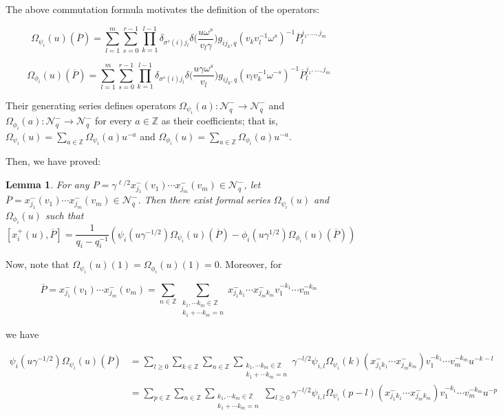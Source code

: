 \documentclass[12pt]{amsart}
\newtheorem{lem}[thm]{Lemma}
\numberwithin{equation}{section}
\newcommand{\Z}{\ensuremath{\mathbb{Z}}}
\newcommand{\mc}[1]{\mathcal{#1}}
\begin{document}
The above commutation formula motivates the definition of the operators: 

$$ \Omega_{\psi_i}(u)(\overline{P}) = \sum_{l=1}^{m}  \sum_{s=0}^{r-1} \prod_{k=1}^{l-1}\delta_{\sigma^s(i)j_l}\delta\Big(\frac{u \omega^s}{v_l\gamma }\Big)   g_{ij_k,q}(v_{k}v_l^{-1}\omega^s)^{-1} \overline{P}_l^{j_1, \ldots, j_m}$$

$$\Omega_{\phi_i}(u)(\overline{P}) = \sum_{l=1}^{m} \sum_{s=0}^{r-1} \prod_{k=1}^{l-1}\delta_{\sigma^s(i)j_l}\delta\Big(\frac{u\gamma \omega^s}{v_l}\Big) g_{ij_k,q}(v_lv_k^{-1}\omega^{-s})^{-1}\overline{P}_l^{j_1, \ldots, j_m} $$

Their generating series defines operators $\Omega_{\psi_i}(a) : \mc{N}_q^- \to \mc{N}_q^-$ and $\Omega_{\phi_i}(a) : \mc{N}_q^- \to \mc{N}_q^- $ for every $a \in \Z$ as their coefficients; that is, $\Omega_{\psi_i}(u) = \sum_{a\in \Z} \Omega_{\psi_i}(a)u^{-a}$ and  $\Omega_{\phi_i}(u) = \sum_{a\in \Z} \Omega_{\phi_i}(a)u^{-a}$. 


Then, we have proved:

\begin{lem}
    For any $P = \gamma^{\ell/2}x_{j_1}^{-}(v_1)\cdots x_{j_m}^{-}(v_m) \in \mc{N}_q^-$, let $\overline{P} = x_{j_1}^{-}(v_1)\cdots x_{j_m}^{-}(v_m) \in \mc{N}_q^-$. Then there exist formal series $\Omega_{\psi_i}(u)$ and $\Omega_{\phi_i}(u)$ such that 
    $$ [x_i^{+}(u), \overline{P}] = \frac{1}{q_i-q_i^{-1}} \left(\psi_i(u\gamma^{-1/2})\Omega_{\psi_i}(u)(\overline{P}) - \phi_i(u\gamma^{1/2})\Omega_{\phi_i}(u)(\overline{P})\right)$$
\end{lem}

Now, note that $\Omega_{\psi_i}(u)(1) = \Omega_{\phi_i}(u)(1) = 0$. Moreover, for 

$$ \overline{P} = x_{j_1}^{-}(v_1)\cdots x_{j_m}^{-}(v_m) = \sum_{n\in\Z}\sum_{\substack{k_1, \cdots k_m \in \Z \\ k_1 + \cdots k_m = n}} x_{j_1k_1}^{-}\cdots x_{j_mk_m}^{-}v_1^{-k_1}\cdots v_m^{-k_m}$$

we have 

\begin{align*}
    \psi_i(u\gamma^{-1/2})\Omega_{\psi_i}(u)(\overline{P}) &= \sum_{l\geq 0}\sum_{k\in\Z}\sum_{n\in\Z}\sum_{\substack{k_1, \cdots k_m \in \Z \\ k_1 + \cdots k_m = n}} \gamma^{-l/2}\psi_{i,l}\Omega_{\psi_i}(k)(x_{j_1k_1}^{-}\cdots x_{j_mk_m}^{-})v_1^{-k_1}\cdots v_m^{-k_m}u^{-k-l} \\
    &=\sum_{p\in\Z}\sum_{n\in\Z}\sum_{\substack{k_1, \cdots k_m \in \Z \\ k_1 + \cdots k_m = n}}\sum_{l\geq 0} \gamma^{-l/2}\psi_{i,l}\Omega_{\psi_i}(p-l)(x_{j_1k_1}^{-}\cdots x_{j_mk_m}^{-})v_1^{-k_1}\cdots v_m^{-k_m}u^{-p}
\end{align*}
\end{document}
